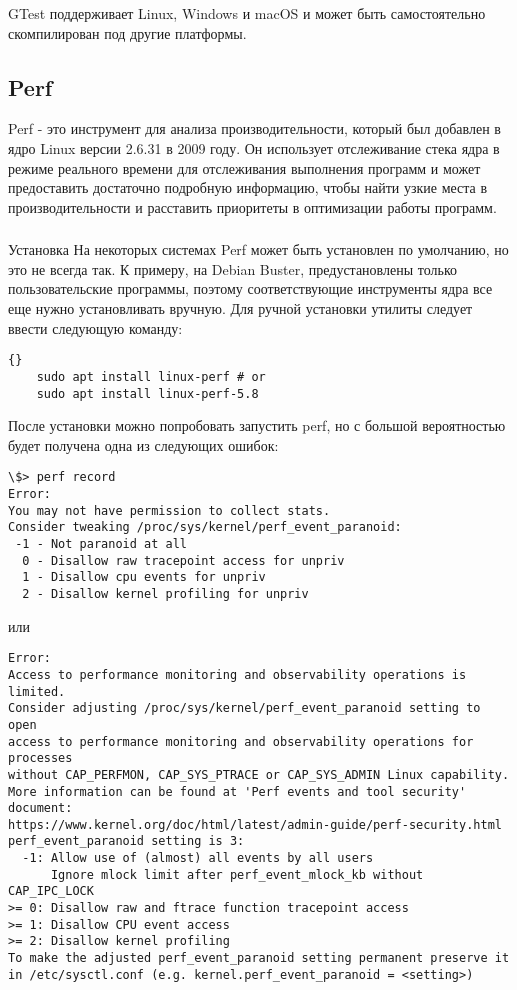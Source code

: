 GTest поддерживает Linux, Windows и macOS и может быть самостоятельно скомпилирован под другие платформы.

\subsection{Perf}

Perf - это инструмент для анализа производительности, который был добавлен в ядро Linux версии 2.6.31 в 2009 году.
Он использует отслеживание стека ядра в режиме реального времени для отслеживания выполнения программ и может предоставить 
достаточно подробную информацию, чтобы найти узкие места в производительности и расставить приоритеты в оптимизации работы программ.

\subsubsection{} Установка
На некоторых системах Perf может быть установлен по умолчанию, но это не всегда так.
К примеру, на Debian Buster, предустановлены только пользовательские программы, поэтому соответствующие инструменты ядра все еще нужно установливать вручную.
Для ручной установки утилиты следует ввести следующую команду:

\begin{lstlisting}[style=CodeListing]{}
    sudo apt install linux-perf # or
    sudo apt install linux-perf-5.8
\end{lstlisting}

После установки можно попробовать запустить perf, но с большой вероятностью будет получена одна из следующих ошибок:

\begin{lstlisting}[style=CodeListing]
\$> perf record
Error:
You may not have permission to collect stats.
Consider tweaking /proc/sys/kernel/perf_event_paranoid:
 -1 - Not paranoid at all
  0 - Disallow raw tracepoint access for unpriv
  1 - Disallow cpu events for unpriv
  2 - Disallow kernel profiling for unpriv
\end{lstlisting}

или

\begin{lstlisting}[style=CodeListing]
Error:
Access to performance monitoring and observability operations is limited.
Consider adjusting /proc/sys/kernel/perf_event_paranoid setting to open
access to performance monitoring and observability operations for processes
without CAP_PERFMON, CAP_SYS_PTRACE or CAP_SYS_ADMIN Linux capability.
More information can be found at 'Perf events and tool security' document:
https://www.kernel.org/doc/html/latest/admin-guide/perf-security.html
perf_event_paranoid setting is 3:
  -1: Allow use of (almost) all events by all users
      Ignore mlock limit after perf_event_mlock_kb without CAP_IPC_LOCK
>= 0: Disallow raw and ftrace function tracepoint access
>= 1: Disallow CPU event access
>= 2: Disallow kernel profiling
To make the adjusted perf_event_paranoid setting permanent preserve it
in /etc/sysctl.conf (e.g. kernel.perf_event_paranoid = <setting>)
\end{lstlisting}

